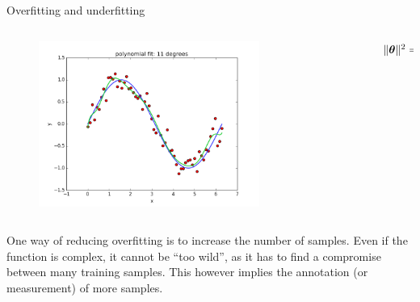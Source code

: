 \documentclass[xcolor=pdftex,dvipsnames,table]{beamer}
\begin{document}
\begin{frame}{Overfitting and underfitting}
\begin{columns}
\begin{column}{.8\textwidth}
\begin{figure}[htb]
	\includegraphics[width=0.75\textwidth]{../graphics/polyfit_degree_11_N60.png}
\end{figure}
\end{column}
\begin{column}{.2\textwidth}
$\| \boldsymbol{\theta} \|^2 = 5647$
\end{column}
\end{columns}
One way of reducing overfitting is to increase the number of samples. Even if the function is complex, it cannot be “too wild”, as it has to find a compromise between many training samples. This however implies the annotation (or measurement) of more samples.
\end{frame}
\end{document}
